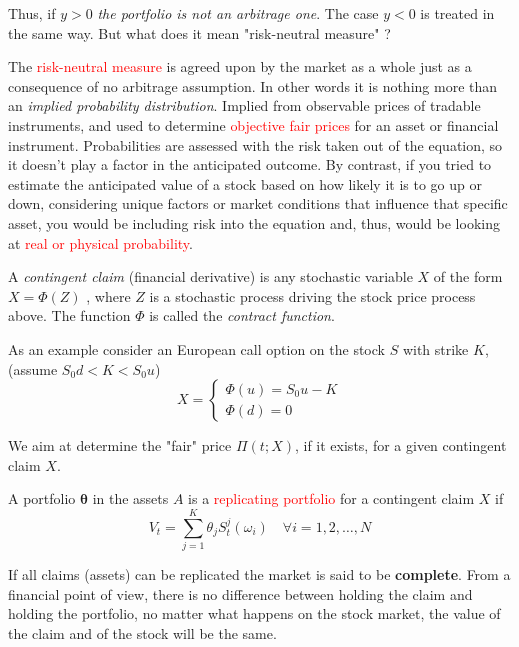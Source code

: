 \documentclass[12pt,a4paper]{article}
\begin{document}
Thus, if $y > 0$ \emph{the portfolio is not an arbitrage one}. The case $y < 0$ is treated in the same way. 
But what does it mean "risk-neutral measure" ?
		
The \textcolor{red}{risk-neutral measure} is agreed upon by the market as a whole just as a consequence of no arbitrage assumption.
In other words it is nothing more than an \emph{implied probability distribution}.
Implied from observable prices of tradable instruments, and used to determine \textcolor{red}{objective fair prices} for an asset or financial instrument. Probabilities are assessed with the risk taken out of the equation, so it doesn’t play a factor in the anticipated outcome.
By contrast, if you tried to estimate the anticipated value of a stock based on how likely it is to go up or down, considering unique factors or market conditions that influence that specific asset, you would be including risk into the equation and, thus, would be looking at \textcolor{red}{real or physical probability}.

A \emph{contingent claim} (financial derivative) is any stochastic variable $X$ of the form $X=\Phi(Z)$ , where $Z$ is a stochastic process driving the stock price process above. 
The function $\Phi$ is called the \emph{contract function}.

As an example consider an European call option on the stock $S$ with strike $K$, (assume $S_0d < K < S_0u$)
\begin{equation*}
X = \begin{cases}
\Phi(u) = S_0 u - K\\
\Phi(d) = 0
\end{cases}
\end{equation*}
		
We aim at determine the "fair" price $\Pi(t; X)$, if it exists, for a given contingent claim $X$.

A portfolio $\mathbf{\theta}$ in the assets $A$ is a \textcolor{red}{replicating portfolio} for a contingent claim $X$ if
\begin{equation}
V_t = \sum_{j=1}^K \theta_j S_t^j(\omega_i)\quad\forall i=1,2,\ldots,N
\end{equation}

If all claims (assets) can be replicated the market is said to be \textbf{complete}.
From a financial point of view, there is no difference between holding the claim and holding the portfolio, no matter what happens on the stock market, the value of the claim and of the stock will be the same.
	
\end{document}
